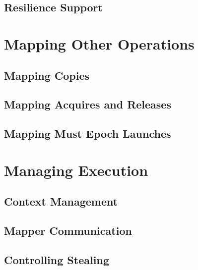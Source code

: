 \subsection{Resilience Support}
\label{subsec:mapping:resilience}



\section{Mapping Other Operations}
\label{sec:mapping:others}

\subsection{Mapping Copies}
\label{subsec:mapping:copies}

\subsection{Mapping Acquires and Releases}
\label{subsec:mapping:acquires}

\subsection{Mapping Must Epoch Launches}
\label{subsec:mapping:mustepoch}



\section{Managing Execution}
\label{sec:mapping:execution}

\subsection{Context Management}
\label{subsec:mapping:context}

\subsection{Mapper Communication}
\label{subsec:mapping:communication}

\subsection{Controlling Stealing}
\label{subsec:mapping:stealing}

